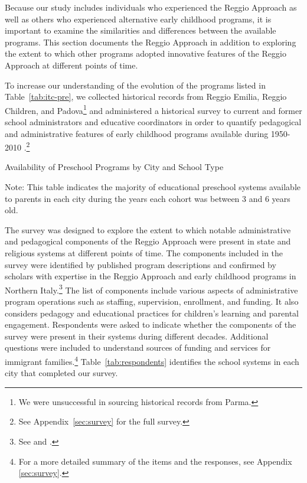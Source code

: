 Because our study includes individuals who experienced the Reggio Approach as well as others who experienced alternative early childhood programs, it is important to examine the similarities and differences between the available programs. This section documents the Reggio Approach in addition to exploring the extent to which other programs adopted innovative features of the Reggio Approach at different points of time.

To increase our understanding of the evolution of the programs listed in Table~\ref{tab:itc-pre}, we collected historical records from Reggio Emilia, Reggio Children, and Padova\footnote{We were unsuccessful in sourcing historical records from Parma.} \citep{Padova-Admin-Data_1964-2011,Reggio-Admin-data_1966-2006,Reggio-Annual-Journals_1994-2011} and administered a historical survey to current and former school administrators and educative coordinators in order to quantify pedagogical and administrative features of early childhood programs available during 1950-2010 \citep{CEHD_2016_Historical-Analysis}.\footnote{See Appendix~\ref{sec:survey} for the full survey.} 
~\\
\begin{table}[H]
\centering
\caption{Availability of Preschool Programs by City and School Type}\label{tab:itc-pre}
\begin{adjustbox}{width=\textwidth}
\begin{threeparttable}
	
\begin{tablenotes}
Note: This table indicates the majority of educational preschool systems available to parents in each city during the years each cohort was between 3 and 6 years old. 
\end{tablenotes}
\end{threeparttable}
\end{adjustbox}
\end{table}

The survey was designed to explore the extent to which notable administrative and pedagogical components of the Reggio Approach were present in state and religious systems at different points of time. The components included in the survey were identified by published program descriptions and confirmed by scholars with expertise in  the Reggio Approach and early childhood programs in Northern Italy.\footnote{See \citet{Edwards-etal-eds_1998_Hundred-Languages} and \citet{Corsaro_2008_Policy-Practice}.} The list of components include various aspects of administrative program operations such as staffing, supervision, enrollment, and funding. It also considers pedagogy and educational practices for children's learning and parental engagement. Respondents were asked to indicate whether the components of the survey were present in their systems during different decades. Additional questions were included to understand sources of funding and services for immigrant families.\footnote{For a more detailed summary of the items and the responses, see Appendix \ref{sec:survey}.} Table~\ref{tab:respondents} identifies the school systems in each city that completed our survey.

